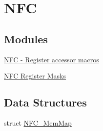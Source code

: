 \hypertarget{group___n_f_c___peripheral}{}\section{N\+F\+C}
\label{group___n_f_c___peripheral}
\subsection*{Modules}
\begin{DoxyCompactItemize}
\item 
\hyperlink{group___n_f_c___register___accessor___macros}{N\+F\+C -\/ Register accessor macros}
\item 
\hyperlink{group___n_f_c___register___masks}{N\+F\+C Register Masks}
\end{DoxyCompactItemize}
\subsection*{Data Structures}
\begin{DoxyCompactItemize}
\item 
struct \hyperlink{struct_n_f_c___mem_map}{N\+F\+C\+\_\+\+Mem\+Map}
\end{DoxyCompactItemize}
